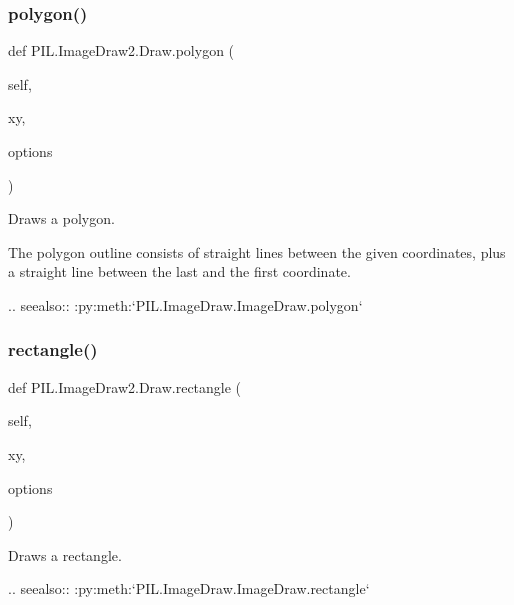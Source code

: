 \subsubsection{\texorpdfstring{polygon()}{polygon()}}
{\footnotesize\ttfamily def P\+I\+L.\+Image\+Draw2.\+Draw.\+polygon (\begin{DoxyParamCaption}\item[{}]{self,  }\item[{}]{xy,  }\item[{}]{options }\end{DoxyParamCaption})}

\begin{DoxyVerb}Draws a polygon.

The polygon outline consists of straight lines between the given
coordinates, plus a straight line between the last and the first
coordinate.


.. seealso:: :py:meth:`PIL.ImageDraw.ImageDraw.polygon`
\end{DoxyVerb}
 \mbox{\label{classPIL_1_1ImageDraw2_1_1Draw_a284be47c2d1623b0f2b00c12bb6d33eb}} 
\subsubsection{\texorpdfstring{rectangle()}{rectangle()}}
{\footnotesize\ttfamily def P\+I\+L.\+Image\+Draw2.\+Draw.\+rectangle (\begin{DoxyParamCaption}\item[{}]{self,  }\item[{}]{xy,  }\item[{}]{options }\end{DoxyParamCaption})}

\begin{DoxyVerb}Draws a rectangle.

.. seealso:: :py:meth:`PIL.ImageDraw.ImageDraw.rectangle`
\end{DoxyVerb}
 \mbox{\label{classPIL_1_1ImageDraw2_1_1Draw_aa9077da45dc5e9d9d817a603e50f8b06}} 
